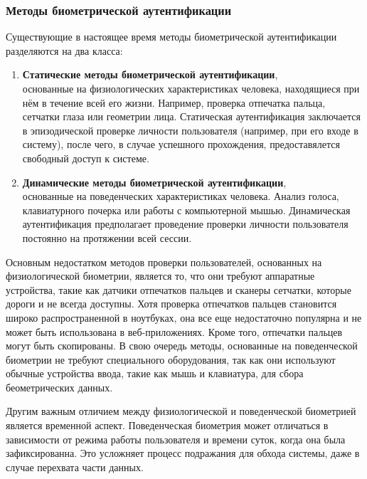 \documentclass[12pt]{article}
\begin{document}
    \subsubsection{Методы биометрической аутентификации}
    \label{sec:Intro:ApplicationArea:AuthenticationMethods:Biometric}

    \par Существующие в настоящее время методы биометрической аутентификации разделяются на два класса:
    \begin{enumerate}
        \item \textbf{Статические методы биометрической аутентификации}, \\
        основанные на физиологических характеристиках человека, находящиеся при нём в течение всей его жизни. Например, проверка отпечатка пальца, сетчатки глаза или геометрии лица. Статическая аутентификация заключается в эпизодической проверке личности пользователя (например, при его входе в систему), после чего, в случае успешного прохождения, предоставялется свободный доступ к системе.
        \item \textbf{Динамические методы биометрической аутентификации}, \\
        основанные на поведенческих характеристиках человека. Анализ голоса, клавиатурного почерка или работы с компьютерной мышью. Динамическая аутентификация предполагает проведение проверки личности пользователя постоянно на протяжении всей сессии.
    \end{enumerate}

    \par Основным недостатком методов проверки пользователей, основанных на физиологической биометрии, является то, что они требуют аппаратные устройства, такие как датчики отпечатков пальцев и сканеры сетчатки, которые дороги и не всегда доступны. Хотя проверка отпечатков пальцев становится широко распространенной в ноутбуках, она все еще недостаточно популярна и не может быть использована в веб-приложениях. Кроме того, отпечатки пальцев могут быть скопированы. В свою очередь методы, основанные на поведенческой биометрии не требуют специального оборудования, так как они используют обычные устройства ввода, такие как мышь и клавиатура, для сбора беометрических данных. \\

    \par Другим важным отличием между физиологической и поведенческой биометрией является временной аспект. Поведенческая биометрия может отличаться в зависимости от режима работы пользователя и времени суток, когда она была зафиксированна. Это усложняет процесс подражания для обхода системы, даже в случае перехвата части данных.\\
\end{document}
